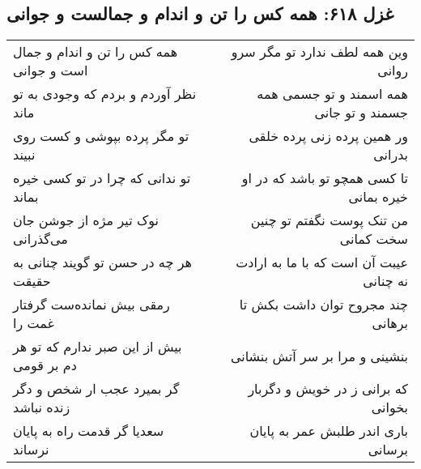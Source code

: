 \begin{center}
\section*{غزل ۶۱۸: همه کس را تن و اندام و جمالست و جوانی}
\label{sec:618}
\begin{longtable}{l p{0.5cm} r}
همه کس را تن و اندام و جمال است و جوانی
&&
وین همه لطف ندارد تو مگر سرو روانی
\\
نظر آوردم و بردم که وجودی به تو ماند
&&
همه اسمند و تو جسمی همه جسمند و تو جانی
\\
تو مگر پرده بپوشی و کست روی نبیند
&&
ور همین پرده زنی پرده خلقی بدرانی
\\
تو ندانی که چرا در تو کسی خیره بماند
&&
تا کسی همچو تو باشد که در او خیره بمانی
\\
نوک تیر مژه از جوشن جان می‌گذرانی
&&
من تنک پوست نگفتم تو چنین سخت کمانی
\\
هر چه در حسن تو گویند چنانی به حقیقت
&&
عیبت آن است که با ما به ارادت نه چنانی
\\
رمقی بیش نمانده‌ست گرفتار غمت را
&&
چند مجروح توان داشت بکش تا برهانی
\\
بیش از این صبر ندارم که تو هر دم بر قومی
&&
بنشینی و مرا بر سر آتش بنشانی
\\
گر بمیرد عجب ار شخص و دگر زنده نباشد
&&
که برانی ز در خویش و دگربار بخوانی
\\
سعدیا گر قدمت راه به پایان نرساند
&&
باری اندر طلبش عمر به پایان برسانی
\\
\end{longtable}
\end{center}
